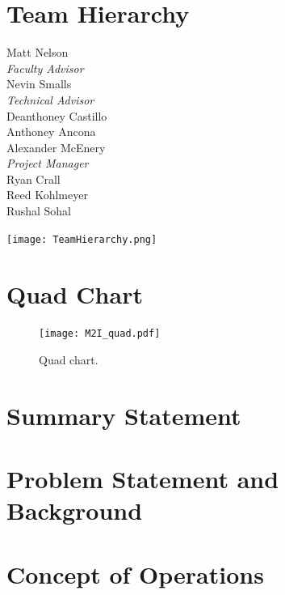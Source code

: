 \documentclass[10pt]{article}
\begin{document}
\section{Team Hierarchy}
\centering
\begin{multicols}{2}\large{
    Matt Nelson             \\\emph{Faculty Advisor}\\[0.7 cm]
    Nevin Smalls            \\\emph{Technical Advisor}\\[0.5 cm]
    Deanthoney Castillo     \\[0.5 cm]
    Anthoney Ancona         \\[0.5 cm]
    Alexander McEnery       \\\emph{Project Manager}\\[0.7 cm]
    Ryan Crall              \\[0.5 cm]
    Reed Kohlmeyer          \\[0.5 cm]
    Rushal Sohal            \\[0.5 cm]
    
    
}\end{multicols}

\texttt{[image: TeamHierarchy.png]}\\[0.35 cm]


\newpage
\tableofcontents
\newpage

\section{Quad Chart}
    
\begin{figure}[H]
\begin{center}
\texttt{[image: M2I\_quad.pdf]}
\caption{Quad chart.}
\label{1.fig}
\end{center}
\end{figure}

\section{Summary Statement}

\section{Problem Statement and Background}

\section{Concept of Operations}
\end{document}
